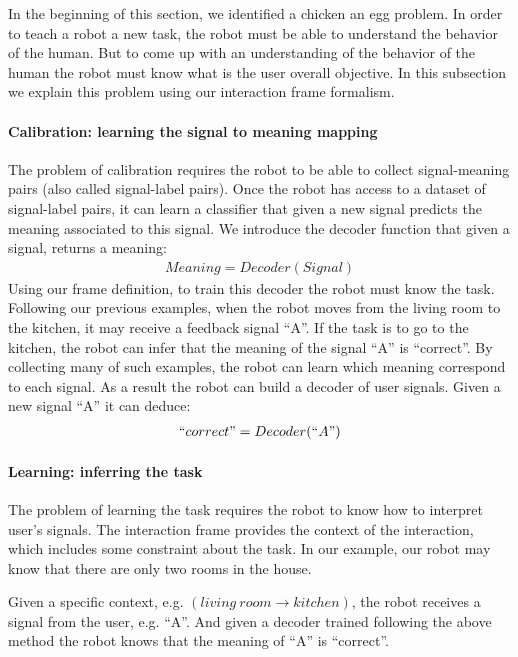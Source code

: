 In the beginning of this section, we identified a chicken an egg problem. In order to teach a robot a new task, the robot must be able to understand the behavior of the human. But to come up with an understanding of the behavior of the human the robot must know what is the user overall objective. In this subsection we explain this problem using our interaction frame formalism.

\paragraph{Calibration: learning the signal to meaning mapping}

The problem of calibration requires the robot to be able to collect signal-meaning pairs (also called signal-label pairs). Once the robot has access to a dataset of signal-label pairs, it can learn a classifier that given a new signal predicts the meaning associated to this signal. We introduce the decoder function that given a signal, returns a meaning:
%
\begin{eqnarray}
    Meaning = Decoder(Signal) \nonumber
\end{eqnarray}
%
Using our frame definition, to train this decoder the robot must know the task. Following our previous examples, when the robot moves from the living room to the kitchen, it may receive a feedback signal ``A''. If the task is to go to the kitchen, the robot can infer that the meaning of the signal ``A'' is ``correct''. By collecting many of such examples, the robot can learn which meaning correspond to each signal. As a result the robot can build a decoder of user signals. Given a new signal ``A'' it can deduce:
%
\begin{eqnarray}
    ``correct" = Decoder(``A") \nonumber
\end{eqnarray}

\paragraph{Learning: inferring the task}

The problem of learning the task requires the robot to know how to interpret user's signals. The interaction frame provides the context of the interaction, which includes some constraint about the task. In our example, our robot may know that there are only two rooms in the house. 

Given a specific context, e.g. $(living~room \rightarrow kitchen)$, the robot receives a signal from the user, e.g. ``A''. And given a decoder trained following the above method the robot knows that the meaning of ``A'' is ``correct''.

